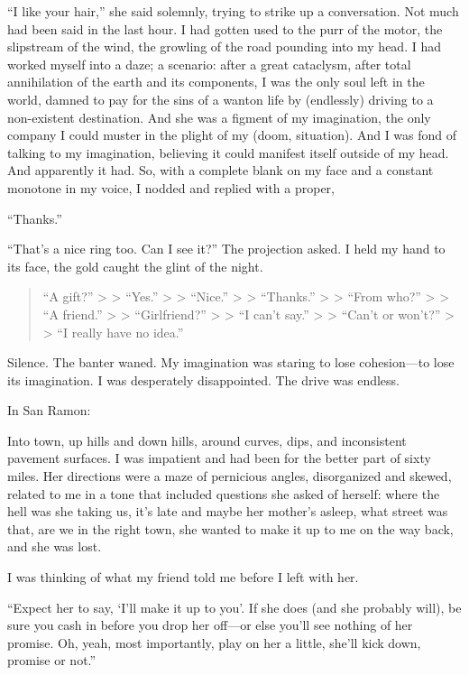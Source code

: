 ``I like your hair,'' she said solemnly, trying to strike up a
conversation. Not much had been said in the last hour. I had gotten used
to the purr of the motor, the slipstream of the wind, the growling of
the road pounding into my head. I had worked myself into a daze; a
scenario: after a great cataclysm, after total annihilation of the earth
and its components, I was the only soul left in the world, damned to pay
for the sins of a wanton life by (endlessly) driving to a non-existent
destination. And she was a figment of my imagination, the only company I
could muster in the plight of my (doom, situation). And I was fond of
talking to my imagination, believing it could manifest itself outside of
my head. And apparently it had. So, with a complete blank on my face and
a constant monotone in my voice, I nodded and replied with a proper,

``Thanks.''

``That's a nice ring too. Can I see it?'' The projection asked. I held
my hand to its face, the gold caught the glint of the night.

\begin{quote}
``A gift?'' \textgreater{} \textgreater{} ``Yes.'' \textgreater{}
\textgreater{} ``Nice.'' \textgreater{} \textgreater{} ``Thanks.''
\textgreater{} \textgreater{} ``From who?'' \textgreater{}
\textgreater{} ``A friend.'' \textgreater{} \textgreater{}
``Girlfriend?'' \textgreater{} \textgreater{} ``I can't say.''
\textgreater{} \textgreater{} ``Can't or won't?'' \textgreater{}
\textgreater{} ``I really have no idea.''
\end{quote}

Silence. The banter waned. My imagination was staring to lose
cohesion---to lose its imagination. I was desperately disappointed. The
drive was endless.

In San Ramon:

Into town, up hills and down hills, around curves, dips, and
inconsistent pavement surfaces. I was impatient and had been for the
better part of sixty miles. Her directions were a maze of pernicious
angles, disorganized and skewed, related to me in a tone that included
questions she asked of herself: where the hell was she taking us, it's
late and maybe her mother's asleep, what street was that, are we in the
right town, she wanted to make it up to me on the way back, and she was
lost.

I was thinking of what my friend told me before I left with her.

``Expect her to say, `I'll make it up to you'. If she does (and she
probably will), be sure you cash in before you drop her off---or else
you'll see nothing of her promise. Oh, yeah, most importantly, play on
her a little, she'll kick down, promise or not.''

